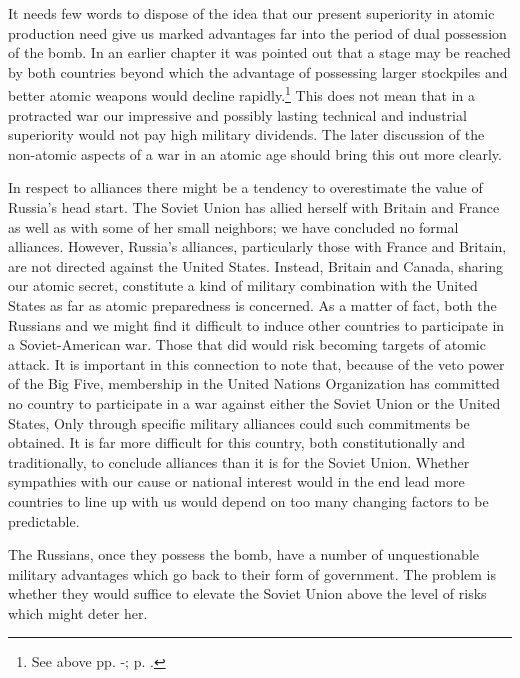 It needs few words to dispose of the idea that our present superiority in atomic production need give us marked advantages far into the period of dual possession of the bomb. In an earlier chapter it was pointed out that a stage may be reached by both countries beyond which the advantage of possessing larger stockpiles and better atomic weapons would decline rapidly.\footnote{See above pp. \pageref{I-SuperiorNos1}-\pageref{I-SuperiorNos2}; p. \pageref{II-Superior}.} This does not mean that in a protracted war our impressive and possibly lasting technical and industrial superiority would not pay high military dividends. The later discussion of the non-atomic aspects of a war in an atomic age should bring this out more clearly.

In respect to alliances there might be a tendency to overestimate the value of Russia's head start. The Soviet Union has allied herself with Britain and France as well as with some of her small neighbors; we have concluded no formal alliances. However, Russia's alliances, particularly those with France and Britain, are not directed against the United States. Instead, Britain and Canada, sharing our atomic secret, constitute a kind of military combination with the United States as far as atomic preparedness is concerned. As a matter of fact, both the Russians and we might find it difficult to induce other countries to participate in a Soviet-American war. Those that did would risk becoming targets of atomic attack. It is important in this connection to note that, because of the veto power of the Big Five, membership in the United Nations Organization has committed no country to participate in a war against either the Soviet Union or the United States, Only through specific military alliances could such commitments be obtained. It is far more difficult for this country, both constitutionally and traditionally, to conclude alliances than it is for the Soviet Union. Whether sympathies with our cause or national interest would in the end lead more countries to line up with us would depend on too many changing factors to be predictable.

The Russians, once they possess the bomb, have a number of unquestionable military advantages which go back to their form of government. The problem is whether they would suffice to elevate the Soviet Union above the level of risks which might deter her.

